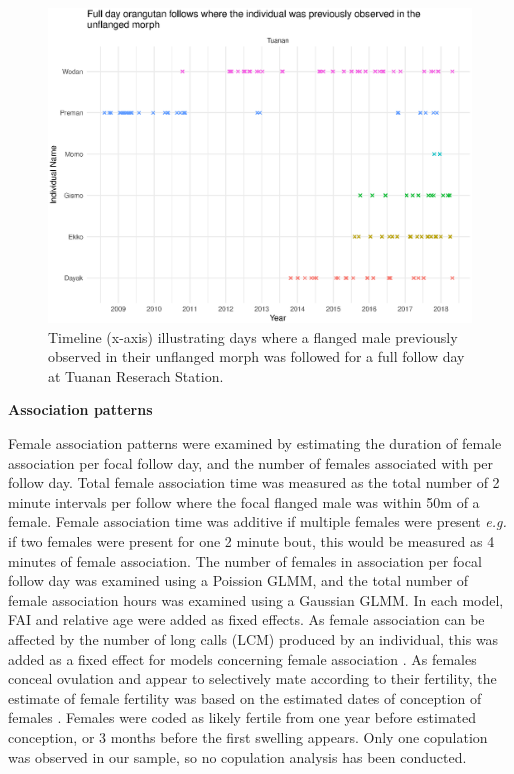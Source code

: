 \begin{figure}
\centering
\includegraphics[width=1\linewidth]{Chapter4/Figs/obs_plot.eps}
\caption{Timeline (x-axis) illustrating days where a flanged male previously observed in their unflanged morph was followed for a full follow day at Tuanan Reserach Station. }
\label{fig:Obs_Tuanan_NN}
\end{figure}


\textbf{Association patterns}

Female association patterns were examined by estimating the duration of female association per focal follow day, and the number of females associated with per follow day.  Total female association time was measured as the total number of 2 minute intervals per follow where the focal flanged male was within 50m of a female. Female association time was additive if multiple females were present \textit{e.g.} if two females were present for one 2 minute bout, this would be measured as 4 minutes of female association. The number of females in association per focal follow day was examined using a Poission GLMM, and the total number of female association hours was examined using a Gaussian GLMM. In each model, FAI and relative age were added as fixed effects. As female association can be affected by the number of long calls (LCM) produced by an individual, this was added as a fixed effect for models concerning female association \citep{Spillmann.2010}. As females conceal ovulation and appear to selectively mate according to their fertility, the estimate of female fertility was based on the estimated dates of conception of females \citep{Knott.2009}. Females were coded as likely fertile from one year before estimated conception, or 3 months before the first swelling appears. Only one copulation was observed in our sample, so no copulation analysis has been conducted.

